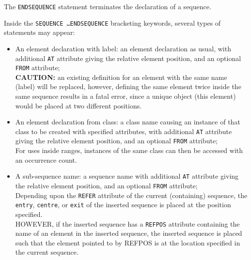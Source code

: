 The \texttt{ENDSEQUENCE} statement terminates the declaration of a
sequence. 

Inside the \texttt{SEQUENCE \ldots ENDSEQUENCE} bracketing keywords,
several types of statements may appear:  
\begin{itemize}

\item An element declaration with label: 
  an element declaration as usual, with additional \texttt{AT}
  attribute giving the relative element position, and an optional
  \texttt{FROM} attribute; \\ 
  {\bf CAUTION:} an existing definition for an element with the
  same name (label) will be replaced, however, defining the same
  element twice inside the same sequence results in a fatal error,
  since a unique object (this element) would be placed at two
  different positions.  

\item An element declaration from class: 
  a class name causing an instance of that class to be created with
  specified attributes, with additional \texttt{AT} attribute giving the
  relative element position, and an optional \texttt{FROM} attribute;\\
  For uses inside ranges, instances of the same class can then be
  accessed with an occurrence count.  

\item A sub-sequence name:
  a sequence name with additional \texttt{AT} attribute giving the
  relative element position, and an optional \texttt{FROM} attribute;\\ 
  Depending upon the {\tt REFER} attribute of the current (containing)
  sequence, the \texttt{entry}, \texttt{centre}, or \texttt{exit} of
  the inserted sequence is placed at the position specified. \\
  HOWEVER, if the inserted sequence has a {\tt REFPOS} attribute containing
  the name of an element in the inserted sequence, the inserted sequence
  is placed such that the element pointed to by REFPOS is at the location
  specified in the current sequence.
\end{itemize} 


